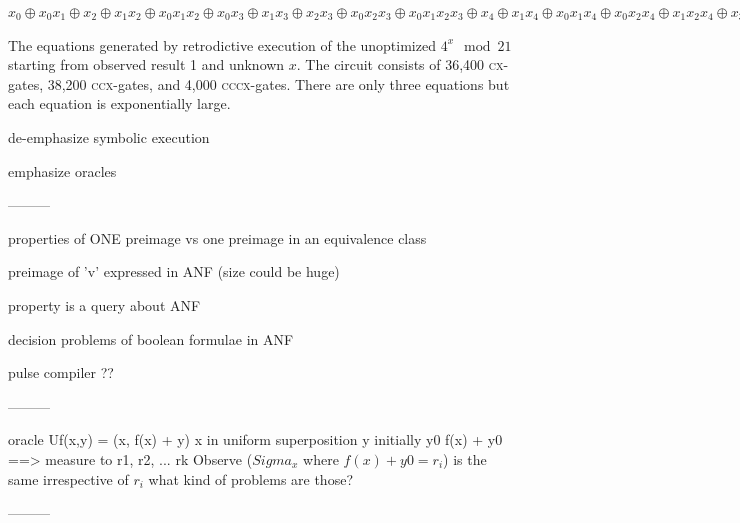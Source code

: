 \documentclass[aps,prl,twocolumn,superscriptaddress,floatfix,notitlepage]{revtex4-2}
\newcommand{\cx}{\textsc{cx}}
\newcommand{\ccx}{\textsc{ccx}}
\newcommand{\cccx}{\textsc{cccx}}
\begin{document}
\bigskip

$x_0 \oplus x_0x_1 \oplus x_2 \oplus x_1x_2 \oplus x_0x_1x_2 \oplus
x_0x_3 \oplus x_1x_3 \oplus x_2x_3 \oplus x_0x_2x_3 \oplus
x_0x_1x_2x_3 \oplus x_4 \oplus x_1x_4 \oplus x_0x_1x_4 \oplus
x_0x_2x_4 \oplus x_1x_2x_4 \oplus x_3x_4 \oplus x_0x_3x_4 \oplus
x_0x_1x_3x_4 \oplus x_2x_3x_4 \oplus x_1x_2x_3x_4 \oplus
x_0x_1x_2x_3x_4 \oplus x_0x_5 \oplus x_1x_5 \oplus x_2x_5 \oplus
x_0x_2x_5 \oplus x_0x_1x_2x_5 \oplus x_3x_5 \oplus x_1x_3x_5 \oplus
x_0x_1x_3x_5 \oplus x_0x_2x_3x_5 \oplus x_1x_2x_3x_5 \oplus x_4x_5
\oplus x_0x_4x_5 \oplus x_0x_1x_4x_5 \oplus x_2x_4x_5 \oplus
x_1x_2x_4x_5 \oplus x_0x_1x_2x_4x_5 \oplus x_0x_3x_4x_5 \oplus
x_1x_3x_4x_5 \oplus x_2x_3x_4x_5 \oplus x_0x_2x_3x_4x_5 \oplus
x_0x_1x_2x_3x_4x_5 = 0$

\bigskip

The equations generated by retrodictive execution of the unoptimized
$4^x \mod{21}$ starting from observed result 1 and unknown $x$. The
circuit consists of 36,400 \cx-gates, 38,200 \ccx-gates, and 4,000
\cccx-gates. There are only three equations but each equation is
exponentially large.

\twocolumngrid
\bigskip



\newpage

de-emphasize symbolic execution

emphasize oracles

---------

properties of ONE preimage
vs
one preimage in an equivalence class

preimage of 'v' expressed in ANF
(size could be huge)

property is a query about ANF

decision problems of boolean formulae in ANF

pulse compiler ?? 

---------

oracle Uf(x,y) = (x, f(x) + y) x in uniform superposition y initially
y0 f(x) + y0 ==> measure to r1, r2, ... rk Observe ($Sigma_x$ where
$f(x)+y0 = r_i$) is the same irrespective of $r_i$ what kind of
problems are those?

---------
\end{document}
